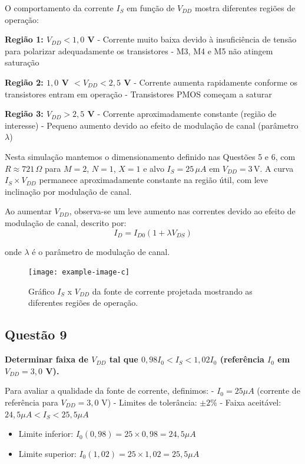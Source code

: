 ﻿\documentclass[12pt,a4paper]{article}
\begin{document}
O comportamento da corrente $I_S$ em função de $V_{DD}$ mostra diferentes regiões de operação:

\textbf{Região 1: $V_{DD} < 1,0$ V}
- Corrente muito baixa devido à insuficiência de tensão para polarizar adequadamente os transistores
- M3, M4 e M5 não atingem saturação

\textbf{Região 2: $1,0$ V $< V_{DD} < 2,5$ V}
- Corrente aumenta rapidamente conforme os transistores entram em operação
- Transistores PMOS começam a saturar

\textbf{Região 3: $V_{DD} > 2,5$ V}
- Corrente aproximadamente constante (região de interesse)
- Pequeno aumento devido ao efeito de modulação de canal (parâmetro $\lambda$)



Nesta simulação mantemos o dimensionamento definido nas Questões 5 e 6, com $R\approx 721\,\Omega$ para $M=2$, $N=1$, $X=1$ e alvo $I_S=25\,\mu A$ em $V_{DD}=3\,\text{V}$. A curva $I_S\times V_{DD}$ permanece aproximadamente constante na região útil, com leve inclinação por modulação de canal.

Ao aumentar $V_{DD}$, observa-se um leve aumento nas correntes devido ao efeito de modulação de canal, descrito por:
\begin{equation*}
I_D = I_{D0}(1 + \lambda V_{DS})
\end{equation*}

onde $\lambda$ é o parâmetro de modulação de canal.

\begin{figure}[H]
    \centering
    \texttt{[image: example-image-c]}
    \caption{Gráfico $I_S$ x $V_{DD}$ da fonte de corrente projetada mostrando as diferentes regiões de operação.}
    \label{fig:is_vdd}
\end{figure}

\subsection*{Questão 9}
	\textbf{Determinar faixa de $V_{DD}$ tal que $0{,}98 I_0 < I_S < 1{,}02 I_0$ (referência $I_0$ em $V_{DD}=3{,}0$ V).}



Para avaliar a qualidade da fonte de corrente, definimos:
- $I_0 = 25 \mu A$ (corrente de referência para $V_{DD} = 3,0$ V)
- Limites de tolerância: $\pm 2\%$
- Faixa aceitável: $24,5 \mu A < I_S < 25,5 \mu A$


\begin{itemize}
    \item Limite inferior: $I_0(0,98) = 25 \times 0,98 = 24,5 \mu A$
    \item Limite superior: $I_0(1,02) = 25 \times 1,02 = 25,5 \mu A$
\end{itemize}
\end{document}
